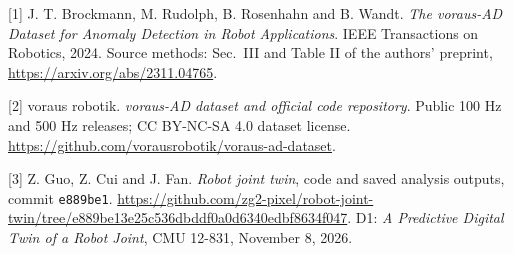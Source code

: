 \documentclass[10pt,letterpaper]{article}
\newcommand{\heading}[1]{\vspace{5pt}{\large\bfseries #1}\par\vspace{1pt}}
\newcommand{\code}[1]{\texttt{\small #1}}
\begin{document}
\heading{References}
{\small
[1] J. T. Brockmann, M. Rudolph, B. Rosenhahn and B. Wandt. \emph{The voraus-AD Dataset for Anomaly Detection in Robot Applications}. IEEE Transactions on Robotics, 2024. Source methods: Sec.\ III and Table II of the authors' preprint, \url{https://arxiv.org/abs/2311.04765}.

[2] voraus robotik. \emph{voraus-AD dataset and official code repository}. Public 100 Hz and 500 Hz releases; CC BY-NC-SA 4.0 dataset license. \url{https://github.com/vorausrobotik/voraus-ad-dataset}.

[3] Z. Guo, Z. Cui and J. Fan. \emph{Robot joint twin}, code and saved analysis outputs, commit \code{e889be1}. \url{https://github.com/zg2-pixel/robot-joint-twin/tree/e889be13e25c536dbddf0a0d6340edbf8634f047}. D1: \emph{A Predictive Digital Twin of a Robot Joint}, CMU 12-831, November 8, 2026.
}
\end{document}
